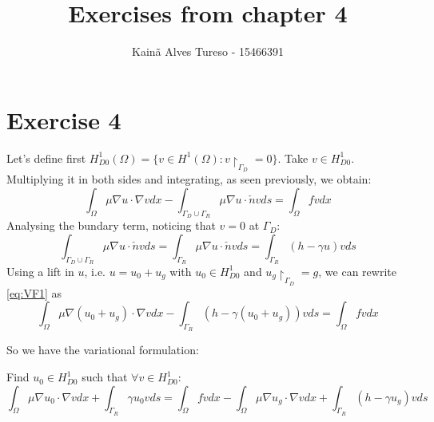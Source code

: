 \documentclass{article}
\title{Exercises from chapter 4}
\author{Kainã Alves Tureso - 15466391}
\begin{document}
    \maketitle

    \section*{Exercise 4}
    Let's define first $H^1_{D0}(\Omega) = \{v \in H^1(\Omega) : v\restriction_{\Gamma_D} = 0\}$. Take $v \in H^1_{D0}$. Multiplying it in both sides and integrating, as seen previously, we obtain:
    \begin{equation}
        \label{eq:VF1}
        \int_{\Omega} \mu \nabla u  \cdot \nabla v dx - \int_{\Gamma_D \cup \Gamma_R} \mu \nabla u \cdot \check{n} v ds = \int_\Omega fv dx
    \end{equation}
    Analysing the bundary term, noticing that $v =0$ at $\Gamma_D$:
    \[
        \int_{\Gamma_D \cup \Gamma_R} \mu \nabla u \cdot \check{n} v ds =  \int_{\Gamma_R} \mu \nabla u \cdot \check{n} v ds = \int_{\Gamma_R} (h-\gamma u)v ds
    \]
    Using a lift in $u$, i.e. $u = u_0 + u_g$ with $u_0 \in H^1_{D0}$ and $u_g \restriction_{\Gamma_D} = g$, we can rewrite \ref{eq:VF1} as 
    \[
        \int_\Omega \mu \nabla (u_0 + u_g) \cdot \nabla v dx - \int_{\Gamma_R} (h - \gamma(u_0 + u_g)) v ds = \int_\Omega fvdx 
    \]

    So we have the variational formulation:

    Find $u_0 \in H^1_{D0}$ such that $\forall v \in H^1_{D0}$:
    \[
        \int_\Omega \mu \nabla u_0 \cdot \nabla v dx + \int_{\Gamma_R} \gamma u_0 v ds = \int_\Omega fvdx - \int_\Omega \mu \nabla u_g \cdot \nabla v dx + \int_{\Gamma_R} (h - \gamma u_g) v ds
    \]
\end{document}
